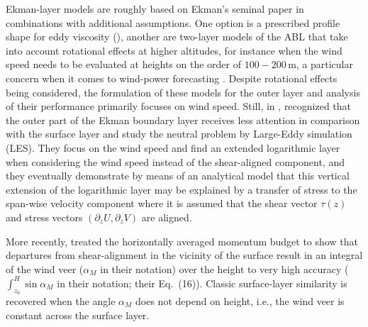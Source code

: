 \documentclass[smallcondensed,final]{svjour3}
\newcommand{\p}{\partial}
\begin{document}
%
%
\par %
%
Ekman-layer models are roughly based on Ekman's seminal \citeyear{ekman:AMA1905} paper in combinations with
additional assumptions. One option is a prescribed profile shape for eddy viscosity (\cite{ellison:QJR1955}), another are two-layer models of the ABL that take into account rotational effects at higher altitudes,
for instance when the wind speed needs to be evaluated at heights on the order of $100-200\,\mathrm{m}$,
a particular concern when it comes to wind-power forecasting \citep{etling:2002, emeis:2018, optis:BM2014}.
%
Despite rotational effects being considered, the formulation of these models for the outer layer
and analysis of their performance primarily focuses on wind speed.
% 
Still, in \citeyear{jiang:JAS2018}, \citeauthor{jiang:JAS2018} recognized that the outer
part of the Ekman boundary layer receives less attention in comparison with the surface layer
and study the neutral problem by Large-Eddy simulation (LES).
%
They focus on the wind speed and find an extended logarithmic layer when considering the wind
speed instead of the shear-aligned component, and they eventually demonstrate by means of
an analytical model that this vertical extension of the logarithmic layer may be explained
by a transfer of stress to the span-wise velocity component where it is assumed that the shear
vector $\tau(z)$ and stress vectors $(\p_zU,\p_zV)$ are aligned. 
%
\par
% 
More recently, \citet{ghannam:QJR2021} treated the horizontally averaged momentum budget to show
that departures from shear-alignment in the vicinity of the surface result in an integral of
the wind veer ($\alpha_M$ in their notation) over the height to very high accuracy ($\int_{z_0}^{H} \sin\alpha_M$ in their notation; their Eq.~(16)).
%
Classic surface-layer similarity is recovered when the angle $\alpha_M$ does not depend on height, i.e., the
wind veer is constant across the surface layer. 
\end{document}
